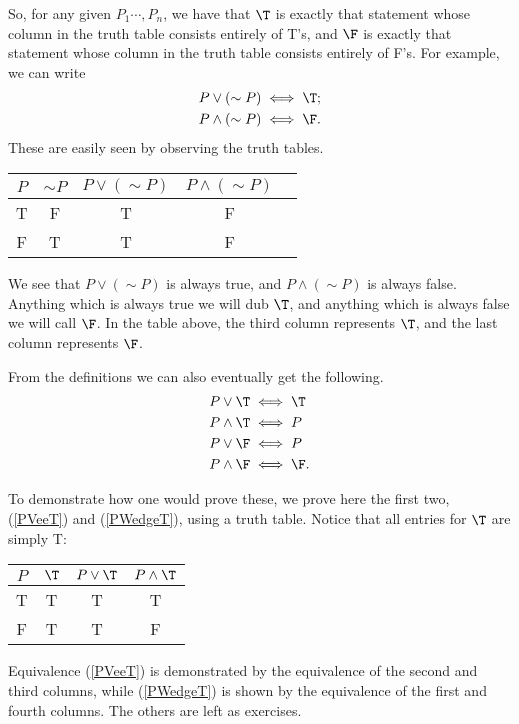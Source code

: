 So, for any given $P_1\cdots,P_n$, we have that $\T$ is 
exactly 
that statement whose column in the truth table consists
entirely of T's, and $\F$ is exactly
that statement whose column in the truth table consists
entirely of F's.
For example, we can write
\begin{align}P\vee(\sim P)&\iff \T;\label{FirstTautology}\\
P\wedge(\sim P)&\iff\F.\label{FirstContradiction}\end{align}
These are easily seen by observing the truth tables.\medskip

\begin{tabular}{|c||c|c|c|c|}
\hline
$P$&$\sim P$&$P\vee(\sim P)$&$P\wedge(\sim P)$\\
\hline
T&F&T&F\\
F&T&T&F\\
\hline
\end{tabular}
\medskip

\noindent
We see that $P\vee(\sim P)$ is always true, and $P\wedge(\sim P)$ 
is always false.  Anything which is always true we will dub $\T$,
and anything which is always false we will call $\F$.
In the table above, the third column represents $\T$, and the
last column represents $\F$.



From the definitions we can also eventually get the following.
\begin{align}
P\vee \T&\iff \T\label{PVeeT}\\
P\wedge\T&\iff P\label{PWedgeT}\\
P\vee\F&\iff P\label{PVeeF}\\
P\wedge\F&\iff \F.\label{PWedgeF}\end{align} 



To demonstrate how one would prove these, we prove here
the first two, (\ref{PVeeT}) and (\ref{PWedgeT}), using a truth table.  Notice
that all entries for $\T$ are simply T:
\bigskip

\begin{tabular}{|c|c||c|c|}
\hline
$P$&$\T$&$P\vee\T$&$P\wedge\T$\\
\hline
T&T&T&T\\ F&T&T&F\\ \hline\end{tabular}
\bigskip

\noindent Equivalence (\ref{PVeeT}) is demonstrated by the equivalence of 
the second and third columns, while (\ref{PWedgeT})
is shown by the equivalence of the first and fourth columns.
The others are left as exercises.


